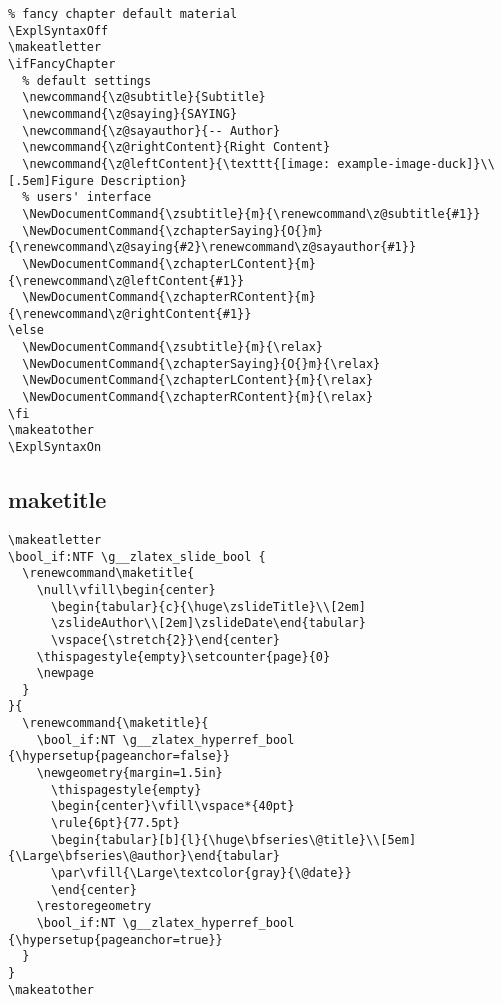 \begin{verbatim}
% fancy chapter default material
\ExplSyntaxOff
\makeatletter
\ifFancyChapter
  % default settings
  \newcommand{\z@subtitle}{Subtitle}
  \newcommand{\z@saying}{SAYING}
  \newcommand{\z@sayauthor}{-- Author}
  \newcommand{\z@rightContent}{Right Content}
  \newcommand{\z@leftContent}{\texttt{[image: example-image-duck]}\\[.5em]Figure Description}
  % users' interface
  \NewDocumentCommand{\zsubtitle}{m}{\renewcommand\z@subtitle{#1}}
  \NewDocumentCommand{\zchapterSaying}{O{}m}{\renewcommand\z@saying{#2}\renewcommand\z@sayauthor{#1}}
  \NewDocumentCommand{\zchapterLContent}{m}{\renewcommand\z@leftContent{#1}}
  \NewDocumentCommand{\zchapterRContent}{m}{\renewcommand\z@rightContent{#1}}
\else 
  \NewDocumentCommand{\zsubtitle}{m}{\relax}
  \NewDocumentCommand{\zchapterSaying}{O{}m}{\relax}
  \NewDocumentCommand{\zchapterLContent}{m}{\relax}
  \NewDocumentCommand{\zchapterRContent}{m}{\relax}
\fi
\makeatother
\ExplSyntaxOn
\end{verbatim}

\subsection{maketitle}
\begin{verbatim}
\makeatletter
\bool_if:NTF \g__zlatex_slide_bool {
  \renewcommand\maketitle{
    \null\vfill\begin{center}
      \begin{tabular}{c}{\huge\zslideTitle}\\[2em]
      \zslideAuthor\\[2em]\zslideDate\end{tabular}
      \vspace{\stretch{2}}\end{center}
    \thispagestyle{empty}\setcounter{page}{0}
    \newpage
  }
}{
  \renewcommand{\maketitle}{
    \bool_if:NT \g__zlatex_hyperref_bool {\hypersetup{pageanchor=false}}
    \newgeometry{margin=1.5in}
      \thispagestyle{empty}
      \begin{center}\vfill\vspace*{40pt}
      \rule{6pt}{77.5pt}
      \begin{tabular}[b]{l}{\huge\bfseries\@title}\\[5em]{\Large\bfseries\@author}\end{tabular}
      \par\vfill{\Large\textcolor{gray}{\@date}}
      \end{center}
    \restoregeometry
    \bool_if:NT \g__zlatex_hyperref_bool {\hypersetup{pageanchor=true}}
  }
}
\makeatother
\end{verbatim}